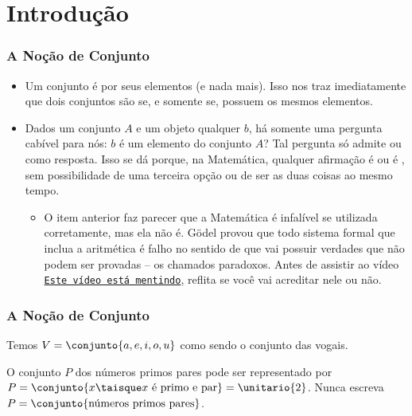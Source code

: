 \section{Introdução}


\begin{frame}
    \frametitle{A Noção de Conjunto}
    
    \begin{itemize}
        \item<1->
        Um conjunto é  por seus elementos (e nada mais). Isso nos traz imediatamente que dois conjuntos são  se, e somente se, possuem os mesmos elementos.

        \item<2->
        Dados um conjunto $A$ e um objeto qualquer $b$, há somente uma pergunta cabível para nós: $b$ é um elemento do conjunto $A$? Tal pergunta só admite  ou  como resposta. Isso se dá porque, na Matemática, qualquer afirmação é  ou é , sem possibilidade de uma terceira opção ou de ser as duas coisas ao mesmo tempo.
        \begin{itemize}
            \item<3-> O item anterior faz parecer que a Matemática é infalível se utilizada corretamente, mas ela não é. Gödel provou que todo sistema formal que inclua a aritmética é falho no sentido de que vai possuir verdades que não podem ser provadas -- os chamados paradoxos.  Antes de assistir ao vídeo \href{https://youtu.be/UI1xR_AECrU}{{\tt Este vídeo está mentindo}}, reflita se você vai acreditar nele ou não.
        \end{itemize}
    \end{itemize}
\end{frame}


\begin{frame}
    \frametitle{A Noção de Conjunto}

    \begin{exemplo}
        Temos $V = \conjunto {a, e, i, o, u}$ como sendo o conjunto das vogais.
    \end{exemplo}\pause

    \begin{exemplo}
        O conjunto $P$ dos números primos pares pode ser representado por $P = \conjunto { x \taisque x \text{ é primo e par}} = \unitario{2}$. Nunca escreva $P = \conjunto{\text{números primos pares}}$.
    \end{exemplo}
\end{frame}